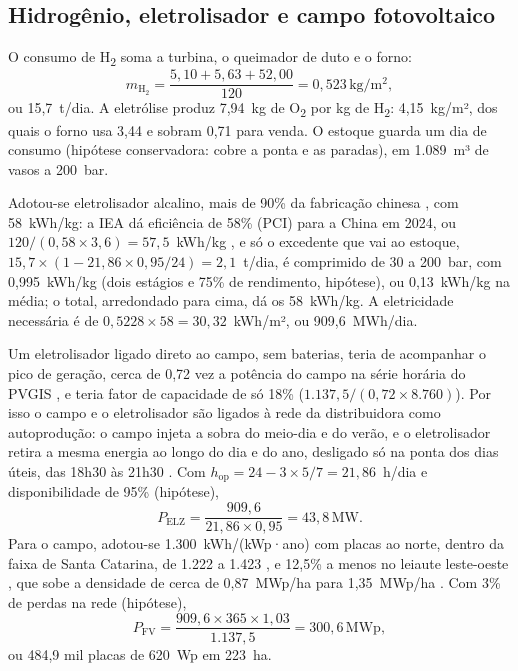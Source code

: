 \documentclass[10pt,a4paper,twocolumn]{article}
\newcommand{\Ht}{H\textsubscript{2}}
\newcommand{\Ot}{O\textsubscript{2}}
\newcommand{\un}[1]{\,\mathrm{#1}}
\begin{document}
\subsection{Hidrogênio, eletrolisador e campo fotovoltaico}

O consumo de \Ht{} soma a turbina, o queimador de duto e o forno:
\begin{equation}
m_{\mathrm{H_2}} = \frac{5{,}10 + 5{,}63 + 52{,}00}{120} = 0{,}523\un{kg/m^2}, \label{eq:mh2}
\end{equation}
ou 15,7~t/dia. A eletrólise produz 7,94~kg de \Ot{} por kg de \Ht: 4,15~kg/m², dos quais o forno usa 3,44 e sobram 0,71 para venda. O estoque guarda um dia de consumo (hipótese conservadora: cobre a ponta e as paradas), em 1.089~m³ de vasos a 200~bar.

Adotou-se eletrolisador alcalino, mais de 90\% da fabricação chinesa \cite{iea2025a}, com 58~kWh/kg: a IEA dá eficiência de 58\% (PCI) para a China em 2024, ou $120/(0{,}58 \times 3{,}6) = 57{,}5$~kWh/kg \cite{iea2025b}, e só o excedente que vai ao estoque, $15{,}7 \times (1 - 21{,}86 \times 0{,}95/24) = 2{,}1$~t/dia, é comprimido de 30 a 200~bar, com 0,995~kWh/kg (dois estágios e 75\% de rendimento, hipótese), ou 0,13~kWh/kg na média; o total, arredondado para cima, dá os 58~kWh/kg. A eletricidade necessária é de $0{,}5228 \times 58 = 30{,}32$~kWh/m², ou 909,6~MWh/dia.

Um eletrolisador ligado direto ao campo, sem baterias, teria de acompanhar o pico de geração, cerca de 0,72 vez a potência do campo na série horária do PVGIS \cite{pvgis2026}, e teria fator de capacidade de só 18\% ($1.137{,}5/(0{,}72 \times 8.760)$). Por isso o campo e o eletrolisador são ligados à rede da distribuidora como autoprodução: o campo injeta a sobra do meio-dia e do verão, e o eletrolisador retira a mesma energia ao longo do dia e do ano, desligado só na ponta dos dias úteis, das 18h30 às 21h30 \cite{aneel2026,aneel2021}. Com $h_{\text{op}} = 24 - 3\times 5/7 = 21{,}86$~h/dia e disponibilidade de 95\% (hipótese),
\begin{equation}
P_{\text{ELZ}} = \frac{909{,}6}{21{,}86 \times 0{,}95} = 43{,}8\un{MW}. \label{eq:pelz}
\end{equation}
Para o campo, adotou-se 1.300~kWh/\allowbreak{}(kWp·ano) com placas ao norte, dentro da faixa de Santa Catarina, de 1.222 a 1.423 \cite{canalsolar2022}, e 12,5\% a menos no leiaute leste-oeste \cite{pvmag2021}, que sobe a densidade de cerca de 0,87~MWp/ha \cite{bolinger2022} para 1,35~MWp/ha \cite{pvmag2021}. Com 3\% de perdas na rede (hipótese),
\begin{equation}
P_{\text{FV}} = \frac{909{,}6 \times 365 \times 1{,}03}{1.137{,}5} = 300{,}6\un{MWp}, \label{eq:pfv}
\end{equation}
ou 484,9 mil placas de 620~Wp em 223~ha.
\end{document}
